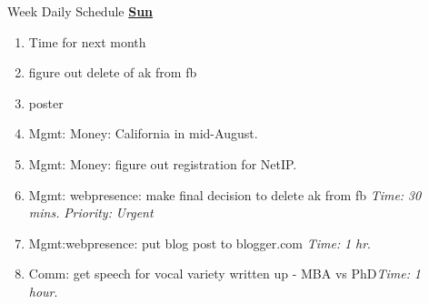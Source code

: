 \documentclass[serif,mathserif,final]{beamer}
\newcommand{\timeEst}[1]{\textit{Time:} \textit{#1}}
\newcommand{\priority}[1]{\textit{Priority:} \textit{#1}}
\begin{document}
\begin{frame}{}
\begin{columns}[t]
\begin{column}{0.50\linewidth}
\begin{block}{Week Daily Schedule}
\textbf{\small \underline{Sun}}
\begin{enumerate}
\tiny \item \tiny  Time for next month 
\item \tiny figure out delete of ak from fb
\item \tiny poster
\item \tiny Mgmt: Money: California in mid-August. 
\item \tiny Mgmt: Money: figure out registration for NetIP.
\item \tiny Mgmt: webpresence: make final decision to delete ak from fb \timeEst{30 mins.} \priority{Urgent} 
\item \tiny Mgmt:webpresence: put blog post to blogger.com \timeEst{1 hr}. 
\item \tiny Comm: get speech for vocal variety written up - MBA vs PhD\timeEst{1 hour}. 

\end{enumerate} 

\end{block} 


\end{column}%

\begin{column}{0.20\linewidth} 


\end{column}
\end{columns}
\end{frame}
\end{document}
